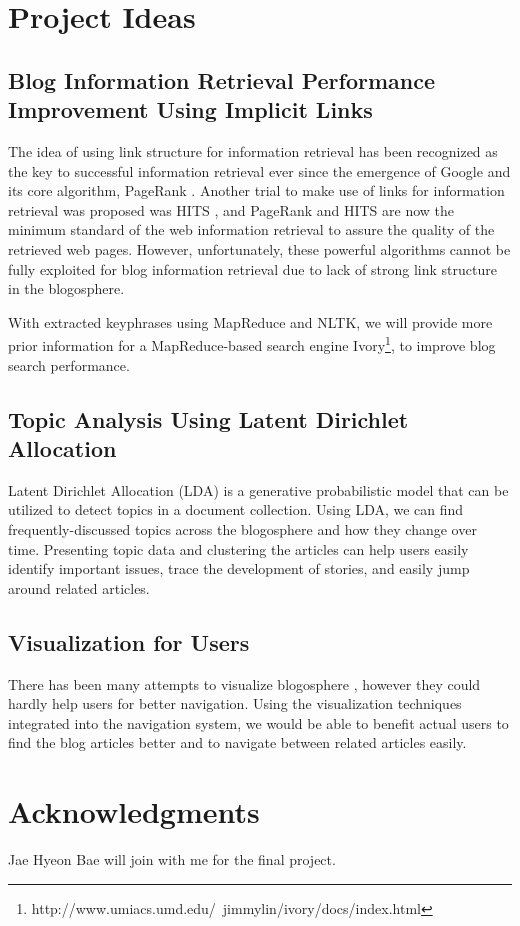 \documentclass{sig-alternate}
\begin{document}
\section{Project Ideas}

\subsection{Blog Information Retrieval Performance Improvement Using Implicit Links}

The idea of using link structure for information retrieval has been recognized as the key to successful information retrieval ever since the emergence of Google and its core algorithm, PageRank \cite{Brin1998a}. Another trial to make use of links for information retrieval was proposed was HITS \cite{Kleinberg1999}, and PageRank and HITS are now the minimum standard of the web information retrieval to assure the quality of the retrieved web pages. However, unfortunately, these powerful algorithms cannot be fully exploited for blog information retrieval due to lack of strong link structure in the blogosphere. 

With extracted keyphrases using MapReduce and NLTK, we will provide more prior information for a MapReduce-based search engine Ivory\footnote{http://www.umiacs.umd.edu/~jimmylin/ivory/docs/index.html}, to improve blog search performance.


\subsection{Topic Analysis Using Latent Dirichlet Allocation}

Latent Dirichlet Allocation (LDA)\cite{Blei2003} is a generative probabilistic model that can be utilized to detect topics in a document collection. Using LDA, we can find frequently-discussed topics across the blogosphere and how they change over time. Presenting topic data and clustering the articles can help users easily identify important issues, trace the development of stories, and easily jump around related articles.

\subsection{Visualization for Users}

There has been many attempts to visualize blogosphere \cite{Tauro2008, Uchida2007}, however they could hardly help users for better navigation. Using the visualization techniques integrated into the navigation system, we would be able to benefit actual users to find the blog articles better and to navigate between related articles easily.

\section{Acknowledgments}
Jae Hyeon Bae will join with me for the final project.
%

\end{document}

